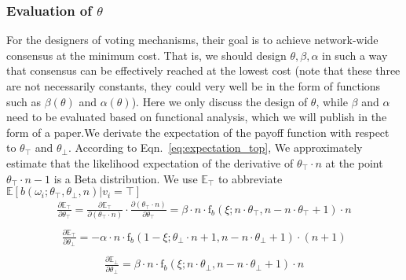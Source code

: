 \documentclass[11pt]{article}
\begin{document}
\subsubsection{Evaluation of $\theta$}
For the designers of voting mechanisms, their goal is to achieve network-wide consensus at the minimum cost. That is, we should design $\theta, \beta, \alpha$ in such a way that consensus can be effectively reached at the lowest cost (note that these three are not necessarily constants, they could very well be in the form of functions such as $\beta(\theta)$ and $\alpha(\theta)$). Here we only discuss the design of $\theta$, while $\beta$ and $\alpha$ need to be evaluated based on functional analysis, which we will publish in the form of a paper.We derivate the expectation of the payoff function with respect to $\theta_\top$ and $\theta_\bot$. According to Eqn.~\ref{eq:expectation_top}, We approximately estimate that the likelihood expectation of the derivative of $\theta_\top\cdot n$ at the point $\theta_\top\cdot n -1$ is a Beta distribution. We use $\mathbb{E}_\top$ to abbreviate $\mathbb{E}[b(\omega_i;\theta_\top,\theta_\bot,n)|v_i=\top]$
\begin{equation}
  \label{eq:expectation_top_to_top}
  \begin{aligned}
  \frac{\partial{\mathbb{E}}_\top}{\partial{\theta_\top}}=\frac{\partial\mathbb{E}_\top}{\partial(\theta_\top\cdot n)}\cdot\frac{\partial(\theta_\top\cdot n)}{\partial\theta_\top}= \beta\cdot n \cdot \text{f}_b(\xi;n\cdot\theta_\top,n-n\cdot\theta_\top+1)\cdot{n}\\
  \end{aligned}
\end{equation}
\begin{equation}
  \label{eq:expectation_top_to_bot}
  \begin{aligned}
  \frac{\partial{\mathbb{E}}_\top}{\partial{\theta_\bot}}= -\alpha\cdot n \cdot  \text{f}_b(1-\xi;\theta_\bot\cdot n+1,n-n\cdot\theta_\bot+1)\cdot(n+1)\\
  \end{aligned}
\end{equation}
\begin{equation}
  \label{eq:expectation_bot_to_bot}
  \begin{aligned}
  \frac{\partial{\mathbb{E}}_\bot}{\partial{\theta_\bot}}= \beta\cdot n \cdot \text{f}_b(\xi;n\cdot\theta_\bot,n-n\cdot\theta_\bot+1)\cdot{n}\\
  \end{aligned}
\end{equation}
\end{document}
